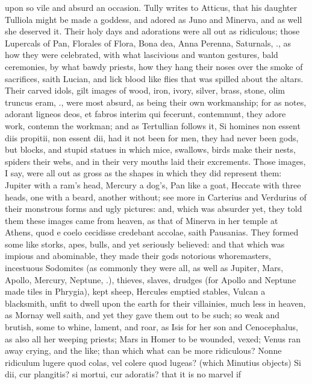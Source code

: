 {upon so vile and absurd an occasion. Tully writes to Atticus, that his
daughter Tulliola might be made a goddess, and adored as Juno and
Minerva, and as well she deserved it. Their holy days and adorations
were all out as ridiculous; those Lupercals of Pan, Florales of Flora,
Bona dea, Anna Perenna, Saturnals, \etc{}., as how they were celebrated,
with what lascivious and wanton gestures, bald ceremonies, by
what bawdy priests, how they hang their noses over the smoke of
sacrifices, saith Lucian, and lick blood like flies that was
spilled about the altars. Their carved idols, gilt images of wood,
iron, ivory, silver, brass, stone, olim truncus eram, \etc{}., were most
absurd, as being their own workmanship; for as \Seneca notes, adorant
ligneos deos, et fabros interim qui fecerunt, contemnunt, they adore
work, contemn the workman; and as Tertullian follows it, Si homines non
essent diis propitii, non essent dii, had it not been for men, they had
never been gods, but blocks, and stupid statues in which mice,
swallows, birds make their nests, spiders their webs, and in their very
mouths laid their excrements. Those images, I say, were all out as
gross as the shapes in which they did represent them: Jupiter with a
ram's head, Mercury a dog's, Pan like a goat, Heccate with three heads,
one with a beard, another without; see more in Carterius and
Verdurius of their monstrous forms and ugly pictures: and, which
was absurder yet, they told them these images came from heaven, as that
of Minerva in her temple at Athens, quod e coelo cecidisse credebant
accolae, saith Pausanias. They formed some like storks, apes, bulls,
and yet seriously believed: and that which was impious and abominable,
they made their gods notorious whoremasters, incestuous Sodomites (as
commonly they were all, as well as Jupiter, Mars, Apollo, Mercury,
Neptune, \etc{}.), thieves, slaves, drudges (for Apollo and Neptune made
tiles in Phrygia), kept sheep, Hercules emptied stables, Vulcan a
blacksmith, unfit to dwell upon the earth for their villainies, much
less in heaven, as Mornay well saith, and yet they gave them out
to be such; so weak and brutish, some to whine, lament, and roar, as
Isis for her son and Cenocephalus, as also all her weeping priests;
Mars in Homer to be wounded, vexed; Venus ran away crying, and the
like; than which what can be more ridiculous? Nonne ridiculum lugere
quod colas, vel colere quod lugeas? (which Minutius objects) Si
dii, cur plangitis? si mortui, cur adoratis? that it is no marvel if
}
